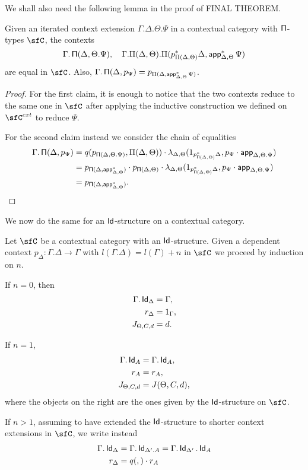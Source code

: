 We shall also need the following lemma in the proof of FINAL THEOREM.

\begin{lem}
  Given an iterated context extension $\Gamma.\Delta.\Theta.\Psi$ in a
  contextual category with $\operatorname{\mathsf{\Pi}}$-types $\sfC$, the contexts
  \[\Gamma.\operatorname{\mathsf{\Pi}}(\Delta,\Theta.\Psi),\quad\Gamma.\Pi(\Delta,\Theta).\Pi(p^*_{\Pi(\Delta,\Theta)}\Delta,\operatorname{\mathsf{app}}^*_{\Delta,\Theta}\Psi)\]
  are equal in $\sfC$. Also,
  $\Gamma.\operatorname{\mathsf{\Pi}}(\Delta,p_{\Psi})=p_{\Pi(\Delta,\operatorname{\mathsf{app}}^*_{\Delta,\Theta}\Psi)}$.
\end{lem}
\begin{proof}
  For the first claim, it is enough to notice that the two contexts reduce to
  the same one in $\sfC$ after applying the inductive construction we defined on
  $\sfC^{cxt}$ to reduce $\Psi$.

  For the second claim instead we consider the chain of equalities
  \begin{align*}
    \Gamma.\operatorname{\mathsf{\Pi}}(\Delta,p_{\Psi})
    &=q(p_{\operatorname{\mathsf{\Pi}}(\Delta,\Theta.\Psi)},\Pi(\Delta,\Theta))\cdot
    \lambda_{\Delta,\Theta}(1_{p^*_{\operatorname{\mathsf{\Pi}}(\Delta,\Theta)}\Delta},p_\Psi\cdot\operatorname{\mathsf{app}}_{\Delta,\Theta.\Psi}) \\
    &=p_{\operatorname{\mathsf{\Pi}}(\Delta,\operatorname{\mathsf{app}}^*_{\Delta,\Theta})}\cdot
    p_{\operatorname{\mathsf{\Pi}}(\Delta,\Theta)}\cdot
    \lambda_{\Delta,\Theta}(1_{p^*_{\operatorname{\mathsf{\Pi}}(\Delta,\Theta)}\Delta},p_\Psi\cdot\operatorname{\mathsf{app}}_{\Delta,\Theta.\Psi}) \\
    &=p_{\operatorname{\mathsf{\Pi}}(\Delta,\operatorname{\mathsf{app}}^*_{\Delta,\Theta})}.
  \end{align*}
\end{proof}

We now do the same for an $\operatorname{\mathsf{Id}}$-structure on a contextual category.

\begin{construction}
  Let $\sfC$ be a contextual category with an $\operatorname{\mathsf{Id}}$-structure. Given a dependent
  context $p_\Delta\colon\Gamma.\Delta\rightarrow\Gamma$ with
  $l(\Gamma.\Delta)=l(\Gamma)+n$ in $\sfC$ we proceed by induction on $n$.

  If $n=0$, then
  \begin{align*}
    \Gamma.\operatorname{\mathsf{Id}}_\Delta &=\Gamma, \\
    r_\Delta &=1_\Gamma, \\
    J_{\Theta,C,d} &=d.
  \end{align*}

  If $n=1$,
  \begin{align*}
    \Gamma.\operatorname{\mathsf{Id}}_A &=\Gamma.\operatorname{\mathsf{Id}}_A, \\
    r_A &=r_A, \\
    J_{\Theta,C,d} &=J(\Theta,C,d),
  \end{align*}
  where the objects on the right are the ones given by the $\operatorname{\mathsf{Id}}$-structure on
  $\sfC$.

  If $n>1$, assuming to have extended the $\operatorname{\mathsf{Id}}$-structure to shorter context
  extensions in $\sfC$, we write instead
  \begin{align*}
    \Gamma.\operatorname{\mathsf{Id}}_{\Delta} &=\Gamma.\operatorname{\mathsf{Id}}_{\Delta'.A}=\Gamma.\operatorname{\mathsf{Id}}_{\Delta'}.\operatorname{\mathsf{Id}}_A \\
    r_{\Delta} &= q(,)\cdot r_A
  \end{align*}
\end{construction}

